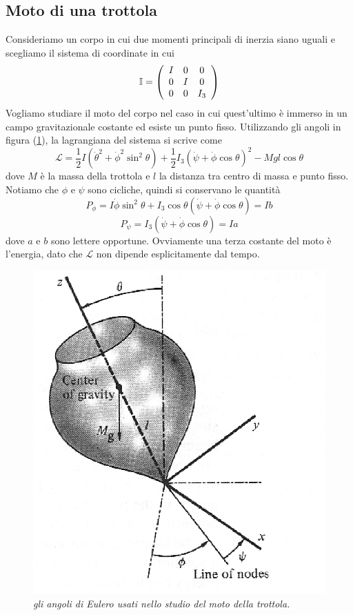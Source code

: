 \documentclass[a4paper,11pt]{article}
\begin{document}
\subsection{Moto di una trottola}
Consideriamo un corpo in cui due momenti principali di inerzia siano uguali e scegliamo il sistema di coordinate in cui
\[\mathbb{I}=\left(\begin{array}{c c c}
I & 0 & 0 \\
0 & I & 0 \\
0 & 0 & I_3
\end{array}\right)\]
Vogliamo studiare il moto del corpo nel caso in cui quest'ultimo è immerso in un campo gravitazionale costante ed esiste un punto fisso. Utilizzando gli angoli in figura (\ref{trottola}), la lagrangiana del sistema si scrive come
\[\mathcal{L}=\frac{1}{2}I\left(\dot{\theta}^2+\dot{\phi}^2\sin^2\theta\right)+\frac{1}{2}I_3\left(\dot{\psi}+\dot{\phi}\cos\theta\right)^2-Mgl\cos\theta\]
dove $M$ è la massa della trottola e $l$ la distanza tra centro di massa e punto fisso. Notiamo che $\phi$ e $\psi$ sono cicliche, quindi si conservano le quantità
\[P_{\phi}=I\dot{\phi}\sin^2\theta+I_3\cos\theta\left(\dot{\psi}+\dot{\phi}\cos\theta\right)=Ib\]
\[P_{\psi}=I_3\left(\dot{\psi}+\dot{\phi}\cos\theta\right)=Ia\]
dove $a$ e $b$ sono lettere opportune.
Ovviamente una terza costante del moto è l'energia, dato che $\mathcal{L}$ non dipende esplicitamente dal tempo.
\begin{figure}
	\centering
	\includegraphics[scale=0.6]{trottola.png}
	\caption{\textit{gli angoli di Eulero usati nello studio del moto della trottola.}}
	\label{trottola}
\end{figure}
\end{document}

